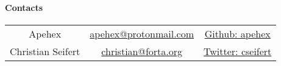 \paragraph{Contacts} \label{sec:contacts}

\begin{table}[h!t]
\begin{tabular}{|C|C|C|}
\hline
{}
 &  &  \\
\hline
Apehex & \href{mailto:apehex@protonmail.com}{apehex@protonmail.com} & \href{https://github.com/apehex}{Github: apehex} \\
\hline
Christian Seifert & \href{mailto:christian@forta.org}{christian@forta.org} & \href{https://twitter.com/cseifert}{Twitter: cseifert} \\
\hline
\end{tabular}
\end{table}
